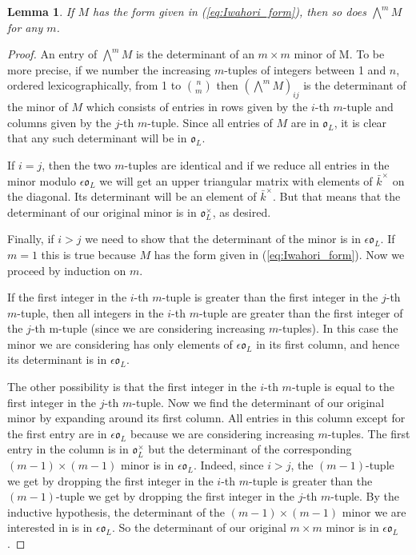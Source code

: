 \documentclass{amsart}
\newtheorem{lemma}{Lemma}[subsection]
\theoremstyle{definition}
\def\O{\mathfrak{o}}
\def\k{\bar{k}}
\def\e{\epsilon}
\def\bw{\bigwedge^m\!}
\begin{document}
  \begin{lemma}
    \label{lemma:Form_lemma}
    If $M$ has the form given in (\ref{eq:Iwahori_form}), then so does $\bw M$ for
    any $m$.
  \end{lemma}
  \begin{proof}
    An entry of $\bw M$ is the determinant of an $m\times m$ minor of M.  To be
    more precise, if we number the increasing $m$-tuples of integers between 1
    and $n$, ordered lexicographically, from 1 to $\binom{n}{m}$ then $(\bw
    M)_{ij}$ is the determinant of the minor of $M$ which consists of entries
    in rows given by the $i$-th $m$-tuple and columns given by the $j$-th
    $m$-tuple.  Since all entries of $M$ are in $\O_L$, it is clear that any
    such determinant will be in $\O_L$.
    
    If $i = j$, then the two $m$-tuples are identical and if we reduce all
    entries in the minor modulo $\e\O_L$ we will get an upper triangular matrix
    with elements of $\k^\times$ on the diagonal.  Its determinant will be an
    element of $\k^\times$.  But that means that the determinant of our
    original minor is in $\O_L^\times$, as desired.

    Finally, if $i > j$ we need to show that the determinant of the minor is in
    $\e\O_L$.  If $m = 1$ this is true because $M$ has the form given in
    (\ref{eq:Iwahori_form}).  Now we proceed by induction on $m$.

    If the first integer in the $i$-th $m$-tuple is greater than the first
    integer in the $j$-th $m$-tuple, then all integers in the $i$-th $m$-tuple
    are greater than the first integer of the $j$-th m-tuple (since we are
    considering increasing $m$-tuples).  In this case the minor we are
    considering has only elements of $\e\O_L$ in its first column, and hence
    its determinant is in $\e\O_L$.

    The other possibility is that the first integer in the $i$-th $m$-tuple is
    equal to the first integer in the $j$-th $m$-tuple.  Now we find the
    determinant of our original minor by expanding around its first column.
    All entries in this column except for the first entry are in $\e\O_L$
    because we are considering increasing $m$-tuples.  The first entry in the
    column is in $\O_L^\times$ but the determinant of the corresponding
    $(m-1)\times(m-1)$ minor is in $\e\O_L$.  Indeed, since $i > j$, the
    $(m-1)$-tuple we get by dropping the first integer in the $i$-th $m$-tuple
    is greater than the $(m-1)$-tuple we get by dropping the first integer in
    the $j$-th $m$-tuple.  By the inductive hypothesis, the determinant of the
    $(m-1)\times(m-1)$ minor we are interested in is in $\e\O_L$.  So the
    determinant of our original $m\times m$ minor is in $\e\O_L$.
  \end{proof}
\end{document}
